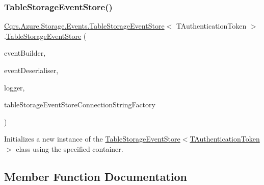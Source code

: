 \subsubsection{\texorpdfstring{Table\+Storage\+Event\+Store()}{TableStorageEventStore()}}
{\footnotesize\ttfamily \hyperlink{classCqrs_1_1Azure_1_1Storage_1_1Events_1_1TableStorageEventStore}{Cqrs.\+Azure.\+Storage.\+Events.\+Table\+Storage\+Event\+Store}$<$ T\+Authentication\+Token $>$.\hyperlink{classCqrs_1_1Azure_1_1Storage_1_1Events_1_1TableStorageEventStore}{Table\+Storage\+Event\+Store} (\begin{DoxyParamCaption}\item[{\hyperlink{interfaceCqrs_1_1Events_1_1IEventBuilder}{I\+Event\+Builder}$<$ T\+Authentication\+Token $>$}]{event\+Builder,  }\item[{\hyperlink{interfaceCqrs_1_1Events_1_1IEventDeserialiser}{I\+Event\+Deserialiser}$<$ T\+Authentication\+Token $>$}]{event\+Deserialiser,  }\item[{I\+Logger}]{logger,  }\item[{\hyperlink{interfaceCqrs_1_1Azure_1_1BlobStorage_1_1ITableStorageStoreConnectionStringFactory}{I\+Table\+Storage\+Store\+Connection\+String\+Factory}}]{table\+Storage\+Event\+Store\+Connection\+String\+Factory }\end{DoxyParamCaption})}



Initializes a new instance of the \hyperlink{classCqrs_1_1Azure_1_1Storage_1_1Events_1_1TableStorageEventStore_af9497418dd323ce2a9d8615ebc7da054}{Table\+Storage\+Event\+Store$<$\+T\+Authentication\+Token$>$} class using the specified container. 



\subsection{Member Function Documentation}
\mbox{\label{classCqrs_1_1Azure_1_1Storage_1_1Events_1_1TableStorageEventStore_a089514182da7a70f35f9237c521c49f0}} 
